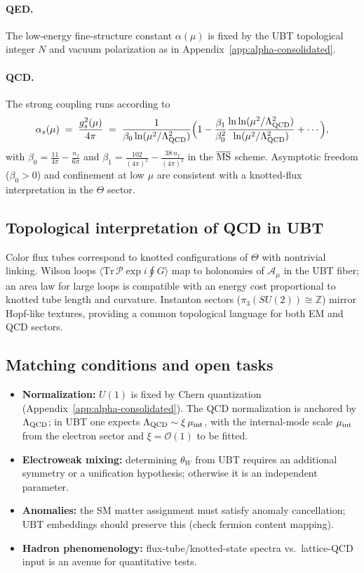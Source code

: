 \paragraph{QED.} The low-energy fine-structure constant $\alpha(\mu)$ is fixed by the UBT topological integer $N$ and
vacuum polarization as in Appendix~\ref{app:alpha-consolidated}.

\paragraph{QCD.} The strong coupling runs according to
\begin{equation}
\alpha_s(\mu) \;=\; \frac{g_s^2(\mu)}{4\pi} \;=\; \frac{1}{\beta_0 \ln(\mu^2/\Lambda_{\rm QCD}^2)}\Big(1 - \frac{\beta_1}{\beta_0^2}\frac{\ln\ln(\mu^2/\Lambda^2_{\rm QCD})}{\ln(\mu^2/\Lambda^2_{\rm QCD})} + \cdots\Big),
\end{equation}
with $\beta_0=\tfrac{11}{4\pi}\!-\!\tfrac{n_f}{6\pi}$ and $\beta_1=\tfrac{102}{(4\pi)^2}\!-\!\tfrac{38\,n_f}{(4\pi)^2}$ in the $\overline{\rm MS}$ scheme. Asymptotic freedom ($\beta_0>0$) and confinement at low $\mu$ are consistent with a knotted-flux interpretation in the $\Theta$ sector.

\subsection{Topological interpretation of QCD in UBT}
Color flux tubes correspond to knotted configurations of $\Theta$ with nontrivial linking.
Wilson loops $\langle \mathrm{Tr}\, \mathcal{P}\exp i\oint G\rangle$ map to holonomies of $\mathcal{A}_\mu$ in the UBT fiber;
an area law for large loops is compatible with an energy cost proportional to knotted tube length and curvature.
Instanton sectors ($\pi_3(SU(2))\cong \mathbb{Z}$) mirror Hopf-like textures, providing a common topological language for both EM and QCD sectors.

\subsection{Matching conditions and open tasks}
\begin{itemize}
\item \textbf{Normalization:} $U(1)$ is fixed by Chern quantization (Appendix~\ref{app:alpha-consolidated}). The QCD normalization is anchored by $\Lambda_{\rm QCD}$; in UBT one expects $\Lambda_{\rm QCD}\sim \xi\,\mu_{\rm int}$, with the internal-mode scale $\mu_{\rm int}$ from the electron sector and $\xi=\mathcal{O}(1)$ to be fitted.
\item \textbf{Electroweak mixing:} determining $\theta_W$ from UBT requires an additional symmetry or a unification hypothesis; otherwise it is an independent parameter.
\item \textbf{Anomalies:} the SM matter assignment must satisfy anomaly cancellation; UBT embeddings should preserve this (check fermion content mapping).
\item \textbf{Hadron phenomenology:} flux-tube/knotted-state spectra vs.\ lattice-QCD input is an avenue for quantitative tests.
\end{itemize}

